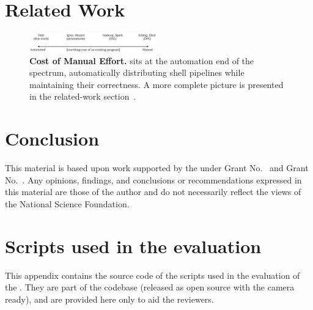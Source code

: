 \documentclass[sigplan,10pt,review,anonymous]{acmart}
\begin{document}
\section{Related Work}
\label{related}

\begin{figure}[t]
\centering
\includegraphics[width=0.49\textwidth]{./figs/dish_spectrum.pdf}
\caption{
  \textbf{Cost of Manual Effort.}
	\sys sits at the automation end of the spectrum, automatically distributing shell pipelines while maintaining their correctness. A more complete picture is presented in the related-work section~.
}
\label{fig:spectrum}
\end{figure}


\section{Conclusion}
\label{discussion}

\begin{acks}
  This material is based upon work supported by the
   under Grant
  No.~ and Grant
  No.~.  Any opinions, findings, and
  conclusions or recommendations expressed in this material are those
  of the author and do not necessarily reflect the views of the
  National Science Foundation.
\end{acks}





\appendix
\section{Scripts used in the evaluation}

This appendix contains the source code of the scripts used in the evaluation of
the \sys. They are part of the codebase (released as open source with the camera
ready), and are provided here only to aid the reviewers.
\end{document}
